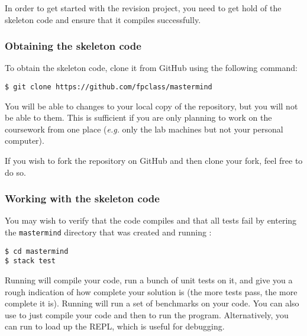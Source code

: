 In order to get started with the revision project, you need to get hold of the skeleton code and ensure that it compiles successfully. 

\subsubsection{Obtaining the skeleton code}

To obtain the skeleton code, clone it from GitHub using the following command:
\begin{verbatim}
$ git clone https://github.com/fpclass/mastermind
\end{verbatim}
You will be able to  changes to your local copy of the repository, but you will not be able to  them. This is sufficient if you are only planning to work on the coursework from one place (\emph{e.g.} only the lab machines but not your personal computer).

If you wish to fork the repository on GitHub and then clone your fork, feel free to do so.

\subsubsection{Working with the skeleton code}

You may wish to verify that the code compiles and that all tests fail by entering the \texttt{\small mastermind} directory that was created and running :
\begin{verbatim}
$ cd mastermind
$ stack test
\end{verbatim}
Running  will compile your code, run a bunch of unit tests on it, and give you a rough indication of how complete your solution is (the more tests pass, the more complete it is). Running  will run a set of benchmarks on your code. You can also use  to just compile your code and then  to run the program. Alternatively, you can run  to load up the REPL, which is useful for debugging.

